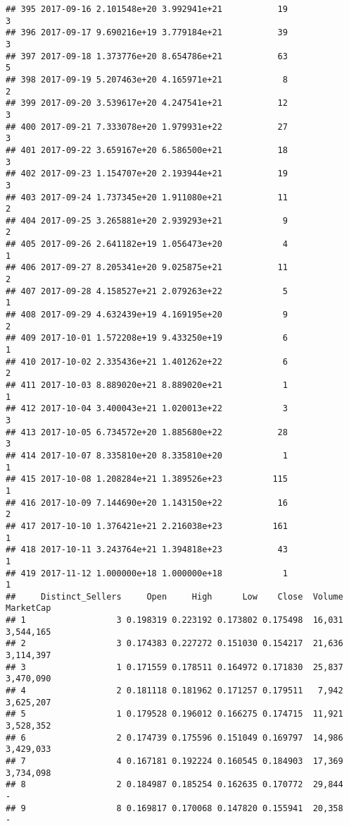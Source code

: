 \documentclass[]{article}
\begin{document}
\begin{verbatim}
## 395 2017-09-16 2.101548e+20 3.992941e+21           19               3
## 396 2017-09-17 9.690216e+19 3.779184e+21           39               3
## 397 2017-09-18 1.373776e+20 8.654786e+21           63               5
## 398 2017-09-19 5.207463e+20 4.165971e+21            8               2
## 399 2017-09-20 3.539617e+20 4.247541e+21           12               3
## 400 2017-09-21 7.333078e+20 1.979931e+22           27               3
## 401 2017-09-22 3.659167e+20 6.586500e+21           18               3
## 402 2017-09-23 1.154707e+20 2.193944e+21           19               3
## 403 2017-09-24 1.737345e+20 1.911080e+21           11               2
## 404 2017-09-25 3.265881e+20 2.939293e+21            9               2
## 405 2017-09-26 2.641182e+19 1.056473e+20            4               1
## 406 2017-09-27 8.205341e+20 9.025875e+21           11               2
## 407 2017-09-28 4.158527e+21 2.079263e+22            5               1
## 408 2017-09-29 4.632439e+19 4.169195e+20            9               2
## 409 2017-10-01 1.572208e+19 9.433250e+19            6               1
## 410 2017-10-02 2.335436e+21 1.401262e+22            6               2
## 411 2017-10-03 8.889020e+21 8.889020e+21            1               1
## 412 2017-10-04 3.400043e+21 1.020013e+22            3               3
## 413 2017-10-05 6.734572e+20 1.885680e+22           28               3
## 414 2017-10-07 8.335810e+20 8.335810e+20            1               1
## 415 2017-10-08 1.208284e+21 1.389526e+23          115               1
## 416 2017-10-09 7.144690e+20 1.143150e+22           16               2
## 417 2017-10-10 1.376421e+21 2.216038e+23          161               1
## 418 2017-10-11 3.243764e+21 1.394818e+23           43               1
## 419 2017-11-12 1.000000e+18 1.000000e+18            1               1
##     Distinct_Sellers     Open     High      Low    Close  Volume MarketCap
## 1                  3 0.198319 0.223192 0.173802 0.175498  16,031 3,544,165
## 2                  3 0.174383 0.227272 0.151030 0.154217  21,636 3,114,397
## 3                  1 0.171559 0.178511 0.164972 0.171830  25,837 3,470,090
## 4                  2 0.181118 0.181962 0.171257 0.179511   7,942 3,625,207
## 5                  1 0.179528 0.196012 0.166275 0.174715  11,921 3,528,352
## 6                  2 0.174739 0.175596 0.151049 0.169797  14,986 3,429,033
## 7                  4 0.167181 0.192224 0.160545 0.184903  17,369 3,734,098
## 8                  2 0.184987 0.185254 0.162635 0.170772  29,844         -
## 9                  8 0.169817 0.170068 0.147820 0.155941  20,358         -

\end{verbatim}
\end{document}
